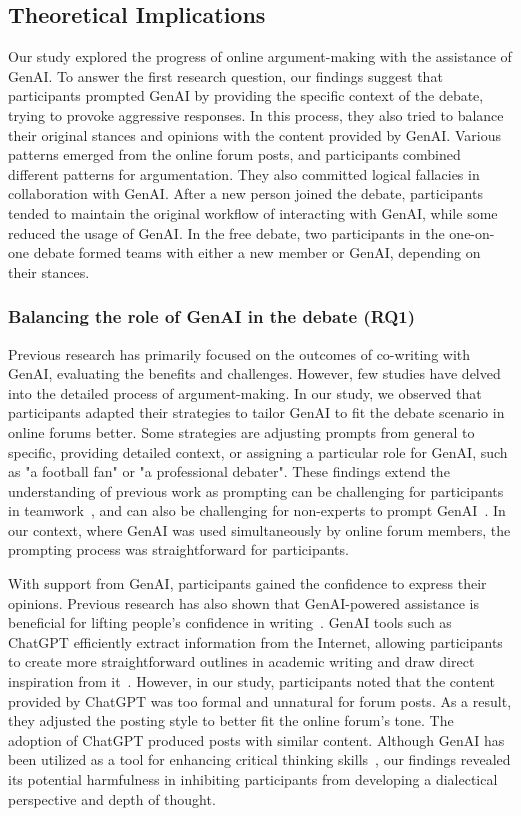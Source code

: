 \subsection{Theoretical Implications}

Our study explored the progress of online argument-making with the assistance of GenAI. To answer the first research question, our findings suggest that participants prompted GenAI by providing the specific context of the debate, trying to provoke aggressive responses. In this process, they also tried to balance their original stances and opinions with the content provided by GenAI. Various patterns emerged from the online forum posts, and participants combined different patterns for argumentation. They also committed logical fallacies in collaboration with GenAI. After a new person joined the debate, participants tended to maintain the original workflow of interacting with GenAI, while some reduced the usage of GenAI. In the free debate, two participants in the one-on-one debate formed teams with either a new member or GenAI, depending on their stances.

\subsubsection{Balancing the role of GenAI in the debate (RQ1)}

Previous research has primarily focused on the outcomes of co-writing with GenAI, evaluating the benefits and challenges. However, few studies have delved into the detailed process of argument-making. In our study, we observed that participants adapted their strategies to tailor GenAI to fit the debate scenario in online forums better. Some strategies are adjusting prompts from general to specific, providing detailed context, or assigning a particular role for GenAI, such as "a football fan" or "a professional debater". These findings extend the understanding of previous work as prompting can be challenging for participants in teamwork~\cite{han_when_2024}, and can also be challenging for non-experts to prompt GenAI~\cite{zamfirescu-pereira_why_2023}. In our context, where GenAI was used simultaneously by online forum members, the prompting process was straightforward for participants.

With support from GenAI, participants gained the confidence to express their opinions. Previous research has also shown that GenAI-powered assistance is beneficial for lifting people's confidence in writing~\cite{li_value_2024}. GenAI tools such as ChatGPT efficiently extract information from the Internet, allowing participants to create more straightforward outlines in academic writing and draw direct inspiration from it~\cite{tu_augmenting_2024}. However, in our study, participants noted that the content provided by ChatGPT was too formal and unnatural for forum posts. As a result, they adjusted the posting style to better fit the online forum's tone. The adoption of ChatGPT produced posts with similar content. Although GenAI has been utilized as a tool for enhancing critical thinking skills~\cite{tanprasert_debate_2024}, our findings revealed its potential harmfulness in inhibiting participants from developing a dialectical perspective and depth of thought.

